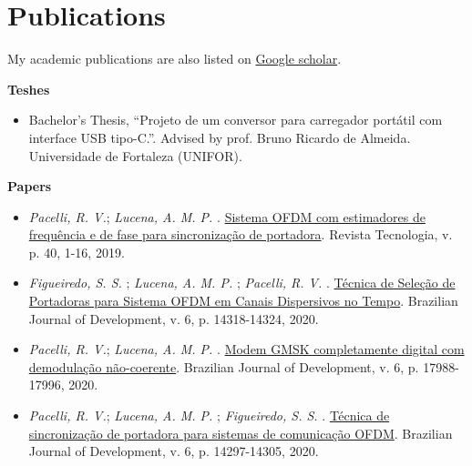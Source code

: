 \section{Publications}
My academic publications are also listed on \href{https://scholar.google.com.br/citations?user=Kj6Gzs4AAAAJ&hl=pt-BR&oi=sra}{Google scholar}.

\textbf{Teshes}
\begin{itemize}[label={-}]
    \item Bachelor's Thesis, ``Projeto de um conversor para carregador portátil com interface USB tipo-C.''. Advised by prof. Bruno Ricardo de Almeida. Universidade de Fortaleza (UNIFOR).
\end{itemize}

\textbf{Papers}
\begin{itemize}[label={-}]
    \item \textit{Pacelli, R. V.}; \textit{Lucena, A. M. P.} . \href{https://periodicos.unifor.br/tec/article/view/7506/5991}{Sistema OFDM com estimadores de frequência e de fase para sincronização de portadora}. Revista Tecnologia, v. p. 40, 1-16, 2019.
    \item \textit{Figueiredo, S. S.} ; \textit{Lucena, A. M. P.} ; \textit{Pacelli, R. V.} . \href{https://www.brazilianjournals.com/index.php/BRJD/article/view/7946/6889}{Técnica de Seleção de Portadoras para Sistema OFDM em Canais Dispersivos no Tempo}. Brazilian Journal of Development, v. 6, p. 14318-14324, 2020.
    \item \textit{Pacelli, R. V.}; \textit{Lucena, A. M. P.} . \href{https://www.brazilianjournals.com/index.php/BRJD/article/view/8538/7345}{Modem GMSK completamente digital com demodulação não-coerente}. Brazilian Journal of Development, v. 6, p. 17988-17996, 2020.
    \item \textit{Pacelli, R. V.}; \textit{Lucena, A. M. P.} ; \textit{Figueiredo, S. S.} . \href{https://www.brazilianjournals.com/index.php/BRJD/article/view/7944/6883}{Técnica de sincronização de portadora para sistemas de comunicação OFDM}. Brazilian Journal of Development, v. 6, p. 14297-14305, 2020.
\end{itemize}


